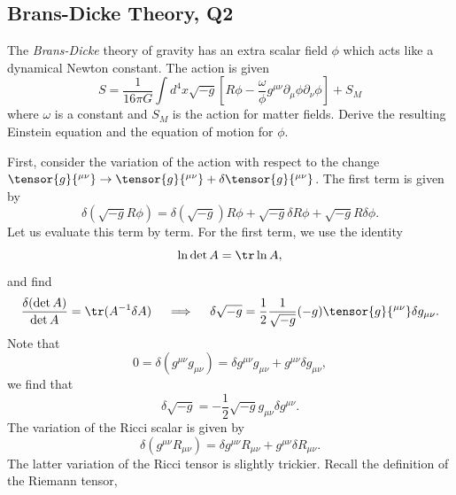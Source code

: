 \subsection{Brans-Dicke Theory, Q2}

The \textit{Brans-Dicke} theory of gravity has an extra scalar field $\phi$ which 
acts like a dynamical Newton constant. The action is given
\begin{equation}
    S = \frac{1}{16\pi G}\int d^4x\sqrt{-g}\left[R\phi - 
    \frac{\omega}{\phi}g^{\mu\nu}\partial_\mu\phi\partial_\nu\phi\right] + S_M
\end{equation}
where $\omega$ is a constant and $S_M$ is the action for matter fields. Derive 
the resulting Einstein equation and the equation of motion for $\phi$.
\begin{solution}
    First, consider the variation of the action with respect to the change $\tensor{g}{^{\mu\nu}} \to \tensor{g}{^{\mu\nu}} + \delta\tensor{g}{^{\mu\nu}}$. The first term is given by
    \begin{equation}
        \delta(\sqrt{-g}R\phi) = \delta(\sqrt{-g})R\phi +\sqrt{-g}\delta R\phi +\sqrt{-g} R\delta\phi.
    \end{equation}
    Let us evaluate this term by term. For the first term, we use the identity 
    \begin{equation}
        \ln \det A = \tr \ln A,
        \label{eq:detA}
    \end{equation}
    and find
    \begin{equation}
        \frac{\delta(\det A)}{\det A} = \tr (A^{-1}\delta A)\quad \implies\quad \delta\sqrt{-g} = \frac{1}{2}\frac{1}{\sqrt{-g}}(-g)\tensor{g}{^{\mu\nu}}\delta g_{\mu\nu}.
    \end{equation}
    Note that
    \begin{equation}
        0=\delta(g^{\mu\nu}g_{\mu\nu}) = \delta g^{\mu\nu}g_{\mu\nu} + g^{\mu\nu}\delta g_{\mu\nu},
    \end{equation}
    we find that
    \begin{equation}
        \delta\sqrt{-g} =  -\frac{1}{2}\sqrt{-g}g_{\mu\nu}\delta g^{\mu\nu}.
    \end{equation}
    The variation of the Ricci scalar is given by
    \begin{equation}
        \delta(g^{\mu\nu}R_{\mu\nu}) = \delta g^{\mu\nu}R_{\mu\nu} + g^{\mu\nu}\delta R_{\mu\nu}.
    \end{equation}
    The latter variation of the Ricci tensor is slightly trickier. Recall the definition of the Riemann tensor,

\end{solution}
